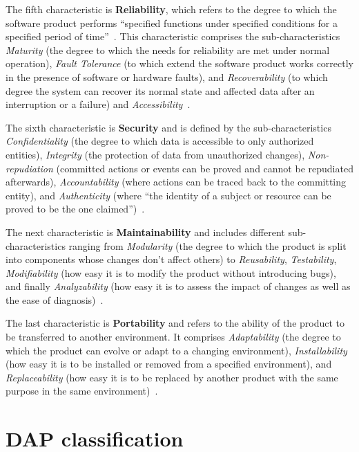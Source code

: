The fifth characteristic is \textbf{Reliability}, which refers to the degree
to which the software product performs ``specified functions under
specified conditions for a specified period of time''~\cite{iso_25010_online_page_2}.
This characteristic comprises the sub-characteristics
\textit{Maturity} (the degree to which the needs for reliability are
met under normal operation), \textit{Fault Tolerance} (to which extend the
software product works correctly in the presence of software or hardware
faults), and \textit{Recoverability} (to which degree the system can
recover its normal state and affected data after an interruption or a
failure) and \textit{Accessibility}~\cite{iso_25010_online_page_2}.

The sixth characteristic is \textbf{Security} and is defined by the
sub-characteristics \textit{Confidentiality} (the degree to which data
is accessible to only authorized entities), \textit{Integrity} (the
protection of data from unauthorized changes), \textit{Non-repudiation}
(committed actions or events can be proved and cannot be repudiated
afterwards), \textit{Accountability} (where actions can be traced back
to the committing entity), and \textit{Authenticity} (where ``the identity
of a subject or resource can be proved to be the one claimed'')~\cite{iso_25010_online_page_3}.

The next characteristic is \textbf{Maintainability} and includes
different sub-characteristics ranging from \textit{Modularity} (the
degree to which the product is split into components whose changes don't
affect others) to \textit{Reusability}, \textit{Testability},  \textit{Modifiability} (how easy
it is to modify the product without introducing bugs), and
finally \textit{Analyzability} (how easy it is to assess the impact of
changes as well as the ease of diagnosis)~\cite{iso_25010_online_page_3}.

The last characteristic is \textbf{Portability} and refers to the
ability of the product to be transferred to another environment. It
comprises \textit{Adaptability} (the degree to which the product can
evolve or adapt to a changing environment), \textit{Installability} (how
easy it is to be installed or removed from a specified environment), and
\textit{Replaceability} (how easy it is to be replaced by another
product with the same purpose in the same environment)~\cite{iso_25010_online_page_3}.

\clearpage
\hypertarget{dap-model}{%
\section{DAP classification}\label{dap-model}}


